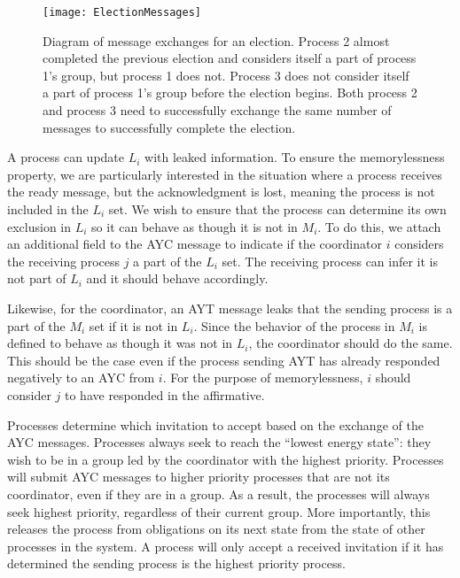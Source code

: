 \begin{figure}[]
\texttt{[image: ElectionMessages]}
\caption[Diagram of message exchanges for an election.]{Diagram of message exchanges for an election. Process 2 almost completed the previous election and considers itself a part of process 1's group, but process 1 does not. Process 3 does not consider itself a part of process 1's group before the election begins. Both process 2 and process 3 need to successfully exchange the same number of messages to successfully complete the election.}
\label{fig:electionmessages}
\end{figure}

A process can update $L_i$ with leaked information.
To ensure the memorylessness property, we are particularly interested in the situation where a process receives the ready message, but the acknowledgment is lost, meaning the process is not included in the $L_i$ set.
We wish to ensure that the process can determine its own exclusion in $L_i$ so it can behave as though it is not in $M_i$.
To do this, we attach an additional field to the \ac{AYC} message to indicate if the coordinator $i$ considers the receiving process $j$ a part of the $L_i$ set.
The receiving process can infer it is not part of $L_i$ and it should behave accordingly.

Likewise, for the coordinator, an \ac{AYT} message leaks that the sending process is a part of the $M_i$ set if it is not in $L_i$.
Since the behavior of the process in $M_i$ is defined to behave as though it was not in $L_i$, the coordinator should do the same.
This should be the case even if the process sending \ac{AYT} has already responded negatively to an \ac{AYC} from $i$.
For the purpose of memorylessness, $i$ should consider $j$ to have responded in the affirmative.

Processes determine which invitation to accept based on the exchange of the \ac{AYC} messages.
Processes always seek to reach the ``lowest energy state'': they wish to be in a group led by the coordinator with the highest priority.
Processes will submit AYC messages to higher priority processes that are not its coordinator, even if they are in a group.
As a result, the processes will always seek highest priority, regardless of their current group.
More importantly, this releases the process from obligations on its next state from the state of other processes in the system.
A process will only accept a received invitation if it has determined the sending process is the highest priority process.

